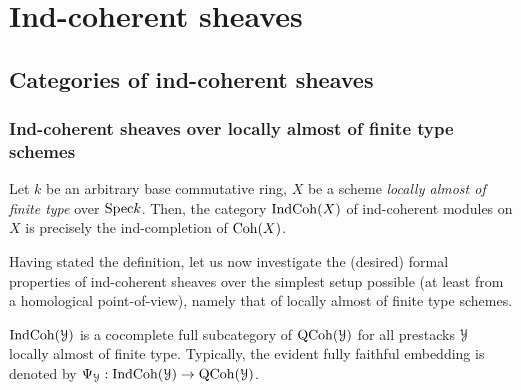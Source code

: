     \section{Ind-coherent sheaves} \label{section: indcoh}
        \subsection{Categories of ind-coherent sheaves} \label{subsection: categories_of_ind_coherent_sheaves}
            \subsubsection{Ind-coherent sheaves over locally almost of finite type schemes}
                \begin{definition} \label{def: ind_coherent_sheaves_on_laft_schemes}
                    Let $k$ be an arbitrary base commutative ring, $X$ be a scheme \textit{locally almost of finite type} over $\mathrm{Spec} k$. Then, the category $\mathrm{Ind}\mathrm{Coh}(X)$ of ind-coherent modules on $X$ is precisely the ind-completion of $\mathrm{Coh}(X)$. 
                \end{definition}
            
                Having stated the definition, let us now investigate the (desired) formal properties of ind-coherent sheaves over the simplest setup possible (at least from a homological point-of-view), namely that of locally almost of finite type schemes. 
                \begin{convention} \label{conv: indcoh_to_qcoh_functor}
                    $\mathrm{Ind}\mathrm{Coh}(\mathcal{Y})$ is a cocomplete full subcategory of $\mathrm{QCoh}(\mathcal{Y})$ for all prestacks $\mathcal{Y}$ locally almost of finite type. Typically, the evident fully faithful embedding is denoted by $\Psi_{\mathcal{Y}}: \mathrm{Ind}\mathrm{Coh}(\mathcal{Y}) \to \mathrm{QCoh}(\mathcal{Y})$. 
                \end{convention}
                
